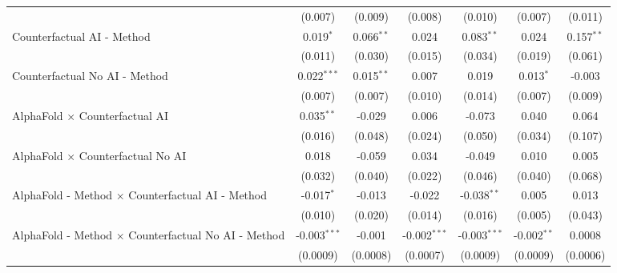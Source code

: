 \begin{tabular}{lcccccc}
                                                              & (0.007)        & (0.009)       & (0.008)        & (0.010)        & (0.007)       & (0.011)\\   
   Counterfactual AI - Method                                 & 0.019$^{*}$    & 0.066$^{**}$  & 0.024          & 0.083$^{**}$   & 0.024         & 0.157$^{**}$\\   
                                                              & (0.011)        & (0.030)       & (0.015)        & (0.034)        & (0.019)       & (0.061)\\   
   Counterfactual No AI - Method                              & 0.022$^{***}$  & 0.015$^{**}$  & 0.007          & 0.019          & 0.013$^{*}$   & -0.003\\   
                                                              & (0.007)        & (0.007)       & (0.010)        & (0.014)        & (0.007)       & (0.009)\\   
   AlphaFold $\times$ Counterfactual AI                       & 0.035$^{**}$   & -0.029        & 0.006          & -0.073         & 0.040         & 0.064\\   
                                                              & (0.016)        & (0.048)       & (0.024)        & (0.050)        & (0.034)       & (0.107)\\   
   AlphaFold $\times$ Counterfactual No AI                    & 0.018          & -0.059        & 0.034          & -0.049         & 0.010         & 0.005\\   
                                                              & (0.032)        & (0.040)       & (0.022)        & (0.046)        & (0.040)       & (0.068)\\   
   AlphaFold - Method $\times$ Counterfactual AI - Method     & -0.017$^{*}$   & -0.013        & -0.022         & -0.038$^{**}$  & 0.005         & 0.013\\   
                                                              & (0.010)        & (0.020)       & (0.014)        & (0.016)        & (0.005)       & (0.043)\\   
   AlphaFold - Method $\times$ Counterfactual No AI - Method  & -0.003$^{***}$ & -0.001        & -0.002$^{***}$ & -0.003$^{***}$ & -0.002$^{**}$ & 0.0008\\   
                                                              & (0.0009)       & (0.0008)      & (0.0007)       & (0.0009)       & (0.0009)      & (0.0006)\\   
   \midrule

\end{tabular}
